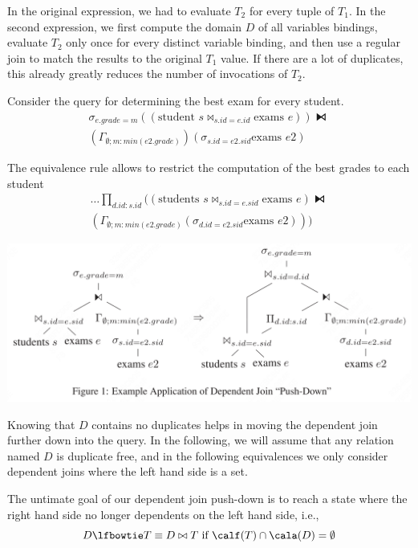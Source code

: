 \documentclass[11pt]{article}
\begin{document}
In the original expression, we had to evaluate \(T_2\) for every tuple of \(T_1\). In the second
expression, we first compute the domain \(D\) of all variables bindings, evaluate \(T_2\) only once
for every distinct variable binding, and then use a regular join to match the results to the original
\(T_1\) value. If there are a lot of duplicates, this already greatly reduces the number of
invocations of \(T_2\).

Consider the query for determining the best exam for every student.
\begin{gather*}
\sigma_{e.grade=m}((\text{student }s\bowtie_{s.id=e.id}\text{exams }e))\lfbowtie\\
(\Gamma_{\emptyset;m:min(e2.grade)})(\sigma_{s.id=e2.sid}\text{exams }e2)
\end{gather*}

The equivalence rule allows to restrict the computation of the best grades to each student
\begin{gather*}
\dots\prod_{d.id:s.id}((\text{students }s\bowtie_{s.id=e.sid}\text{exams }e)\lfbowtie\\
(\Gamma_{\emptyset;m:min(e2.grade)}(\sigma_{d.id=e2.sid}\text{exams }e2)))
\end{gather*}

\begin{center}
\includegraphics[width=.8\textwidth]{../../images/papers/53.png}
\label{}
\end{center}

Knowing that \(D\) contains no duplicates helps in moving the dependent join further down into the
query. In the following, we will assume that any relation named \(D\) is duplicate free, and in the
following equivalences we only consider dependent joins where the left hand side is a set.

The untimate goal of our dependent join push-down is to reach a state where the right hand side no
longer dependents on the left hand side, i.e.,
\begin{equation*}
D\lfbowtie T\equiv D\bowtie T\text{ if }\calf(T)\cap\cala(D)=\emptyset
\end{equation*}
\end{document}
